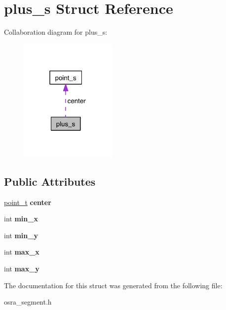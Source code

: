 \hypertarget{structplus__s}{\section{plus\-\_\-s Struct Reference}
\label{structplus__s}
}


Collaboration diagram for plus\-\_\-s\-:
\nopagebreak
\begin{figure}[H]
\begin{center}
\leavevmode
\includegraphics[width=135pt]{structplus__s__coll__graph}
\end{center}
\end{figure}
\subsection*{Public Attributes}
\begin{DoxyCompactItemize}
\item 
\hypertarget{structplus__s_a201e747878e560e2a077faa0b76e1904}{\hyperlink{structpoint__s}{point\-\_\-t} {\bfseries center}}\label{structplus__s_a201e747878e560e2a077faa0b76e1904}

\item 
\hypertarget{structplus__s_a3fbf94476eaaafe1efce09ec47c3abcc}{int {\bfseries min\-\_\-x}}\label{structplus__s_a3fbf94476eaaafe1efce09ec47c3abcc}

\item 
\hypertarget{structplus__s_a44a98545f8417e631aeae30d15b67b22}{int {\bfseries min\-\_\-y}}\label{structplus__s_a44a98545f8417e631aeae30d15b67b22}

\item 
\hypertarget{structplus__s_a7592d8a31a36ee2f3595576abd4a8b62}{int {\bfseries max\-\_\-x}}\label{structplus__s_a7592d8a31a36ee2f3595576abd4a8b62}

\item 
\hypertarget{structplus__s_acc4aaf639bb01dba5865297324b6f3dd}{int {\bfseries max\-\_\-y}}\label{structplus__s_acc4aaf639bb01dba5865297324b6f3dd}

\end{DoxyCompactItemize}


The documentation for this struct was generated from the following file\-:\begin{DoxyCompactItemize}
\item 
osra\-\_\-segment.\-h\end{DoxyCompactItemize}
